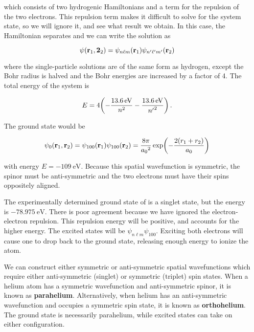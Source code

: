 \documentclass[12pt, titlepage]{article}
\begin{document}
which consists of two hydrogenic Hamiltonians and a term for the  repulsion of the two electrons. This repulsion term makes it difficult to solve for the system state, so we will ignore it, and see what result we obtain. In this case, the Hamiltonian separates and we can write the solution as

\begin{equation}
	\psi(\vb{r}_1,\vb{2}_2) = \psi_{n\ell m}(\vb{r}_1)\psi_{n^\prime\ell^\prime m^\prime}(\vb{r}_2)
\end{equation} 

where the single-particle solutions are of the same form as hydrogen, except the Bohr radius is halved and the Bohr energies are increased by a factor of 4. The total energy of the system is

\begin{equation}
	E = 4\qty(-\frac{\SI{13.6}{\eV}}{n^2} - \frac{\SI{13.6}{\eV}}{{n^\prime}^2}) \,.
\end{equation}

The ground state would be 

\begin{equation}
	\psi_{0}(\vb{r}_1,\vb{r}_2) = \psi_{100}(\vb{r}_1)\psi_{100}(\vb{r}_2) = \frac{8\pi}{{a_0}^2}\exp(-\frac{2(r_1+r_2)}{a_0})
\end{equation}

with energy $E = \SI{-109}{\eV}$. Because this spatial wavefunction is symmetric, the spinor must be anti-symmetric and the two electrons must have their spins oppositely aligned.

The experimentally determined ground state of  is a singlet state, but the energy is $\SI{-78.975}{\eV}$. There is poor agreement because we have ignored the electron-electron repulsion. This repulsion energy will be positive, and accounts for the higher energy. The excited states will be $\psi_{n\ell m}\psi_{100}$. Exciting both electrons will cause one to drop back to the ground state, releasing enough energy to ionize the atom.

We can construct either symmetric or anti-symmetric spatial wavefunctions which require either anti-symmetric (singlet) or symmetric (triplet) spin states. When a helium atom has a symmetric wavefunction and anti-symmetric spinor, it is known as \textbf{parahelium}. Alternatively, when helium has an anti-symmetric wavefunction and occupies a symmetric spin state, it is known as \textbf{orthohelium}. The ground state is necessarily parahelium, while excited states can take on either configuration.
\end{document}
